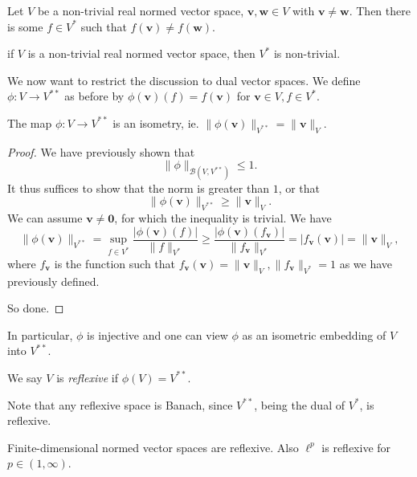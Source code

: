 \documentclass[a4paper]{article}
\begin{document}
\begin{cor}
  Let $V$ be a non-trivial real normed vector space, $\mathbf{v}, \mathbf{w}\in V$ with $\mathbf{v}\not= \mathbf{w}$. Then there is some $f\in V^*$ such that $f(\mathbf{v}) \not= f(\mathbf{w})$.
\end{cor}

\begin{cor}
  if $V$ is a non-trivial real normed vector space, then $V^*$ is non-trivial.
\end{cor}

We now want to restrict the discussion to dual vector spaces. We define $\phi: V\to V^{**}$ as before by $\phi(\mathbf{v})(f) = f(\mathbf{v})$ for $\mathbf{v}\in V, f\in V^*$.

\begin{prop}
  The map $\phi: V\to V^{**}$ is an isometry, ie. $\|\phi(\mathbf{v})\|_{V^{**}} = \|\mathbf{v}\|_V$.
\end{prop}

\begin{proof}
  We have previously shown that
  \[
    \|\phi\|_{\mathcal{B}(V, V^{**})} \leq 1.
  \]
  It thus suffices to show that the norm is greater than $1$, or that
  \[
    \|\phi(\mathbf{v})\|_{V^{**}} \geq \|\mathbf{v}\|_V.
  \]
  We can assume $\mathbf{v}\not= \mathbf{0}$, for which the inequality is trivial. We have
  \[
    \|\phi(\mathbf{v})\|_{V^{**}} = \sup_{f\in V^*} \frac{|\phi(\mathbf{v})(f)|}{\|f\|_{V^*}} \geq \frac{|\phi(\mathbf{v})(f_\mathbf{v})|}{\|f_\mathbf{v}\|_{V^*}} = |f_\mathbf{v}(\mathbf{v})| = \|\mathbf{v}\|_V,
  \]
  where $f_\mathbf{v}$ is the function such that $f_\mathbf{v}(\mathbf{v}) = \|\mathbf{v}\|_V, \|f_\mathbf{v}\|_{V^*} = 1$ as we have previously defined.

  So done.
\end{proof}

In particular, $\phi$ is injective and one can view $\phi$ as an isometric embedding of $V$ into $V^{**}$.

\begin{defi}[Reflexive]
  We say $V$ is \emph{reflexive} if $\phi(V) = V^{**}$.
\end{defi}
Note that any reflexive space is Banach, since $V^{**}$, being the dual of $V^*$, is reflexive.

\begin{eg}
  Finite-dimensional normed vector spaces are reflexive. Also $\ell^p$ is reflexive for $p \in (1, \infty)$.
\end{eg}
\end{document}
